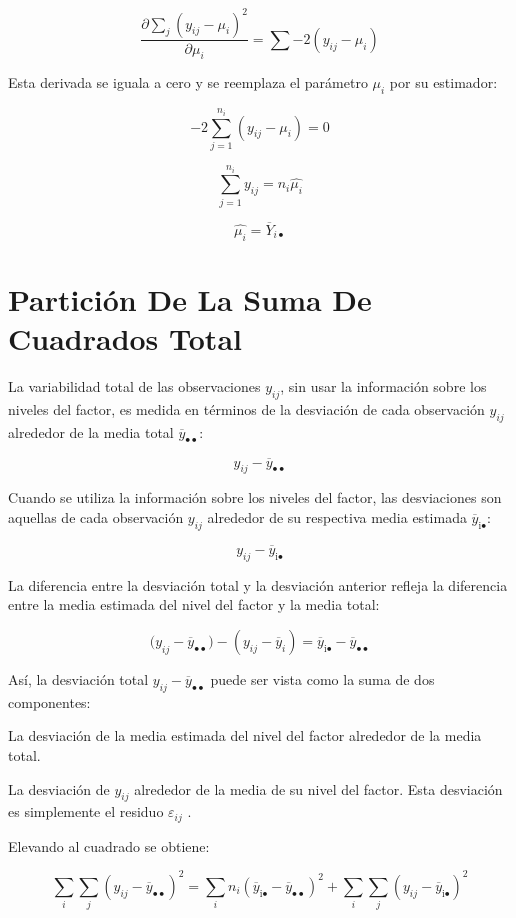 \documentclass[]{book}
\theoremstyle{definition}
\theoremstyle{definition}
\theoremstyle{definition}
\theoremstyle{remark}
\begin{document}
\[
\frac{\partial\sum_{j}^{}\left( y_{ij} - \mu_{i} \right)^{2}}{\partial\mu_{i}} = \sum_{}^{}{- 2\left( y_{ij} - \mu_{i} \right)}
\]

Esta derivada se iguala a cero y se reemplaza el parámetro \(\mu_{i}\)
por su estimador:

\[
- 2\sum_{j = 1}^{n_{i}}\left( y_{ij} - \mu_{i} \right) = 0
\]

\[
\sum_{j = 1}^{n_{i}}y_{ij} = n_{i}\hat{\mu_{i}}
\]

\[
\hat{\mu_{i}} = \overline{Y}_{i\bullet}
\]

\hypertarget{particion-de-la-suma-de-cuadrados-total}{%
\section{Partición De La Suma De Cuadrados
Total}\label{particion-de-la-suma-de-cuadrados-total}}

La variabilidad total de las observaciones \(y_{ij}\), sin usar la
información sobre los niveles del factor, es medida en términos de la
desviación de cada observación \(y_{ij}\) alrededor de la media total
\({\overline{y}}_{\bullet\bullet}\):

\[
y_{ij} - {\overline{y}}_{\bullet\bullet}
\]

Cuando se utiliza la información sobre los niveles del factor, las
desviaciones son aquellas de cada observación \(y_{ij}\) alrededor de su
respectiva media estimada \({\overline{y}}_{\text{i}\bullet}\):

\[
y_{ij} - {\overline{y}}_{\text{i}\bullet}
\]

La diferencia entre la desviación total y la desviación anterior refleja
la diferencia entre la media estimada del nivel del factor y la media
total:

\[
{(y}_{ij} - {\overline{y}}_{\bullet\bullet}) - (y_{ij} - {\overline{y}}_{i}) = {\overline{y}}_{\text{i}\bullet} - {\overline{y}}_{\bullet\bullet}
\]

Así, la desviación total \(y_{ij} - {\overline{y}}_{\bullet\bullet}\)
puede ser vista como la suma de dos componentes:

La desviación de la media estimada del nivel del factor alrededor de la
media total.

La desviación de \(y_{ij}\) alrededor de la media de su nivel del
factor. Esta desviación es simplemente el residuo \(\varepsilon_{ij}\) .

Elevando al cuadrado se obtiene:

\[
\sum_{i}^{}{\sum_{j}^{}\left( y_{ij} - {\overline{y}}_{\bullet\bullet} \right)^{2}} = \sum_{i}^{}{n_{i}\left( {\overline{y}}_{\text{i}\bullet} - {\overline{y}}_{\bullet\bullet} \right)^{2}} + \sum_{i}^{}{\sum_{j}^{}\left( y_{ij} - {\overline{y}}_{\text{i}\bullet} \right)^{2}}
\]
\end{document}
